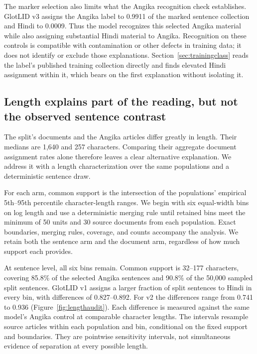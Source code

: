 \documentclass[final]{clv2025}
\begin{document}
The marker selection also limits what the Angika recognition check establishes. GlotLID v3 assigns the Angika label to 0.9911 of the marked sentence collection and Hindi to 0.0009. Thus the model recognizes this selected Angika material while also assigning substantial Hindi material to Angika. Recognition on these controls is compatible with contamination or other defects in training data; it does not identify or exclude those explanations. Section~\ref{sec:trainingclass} reads the label's published training collection directly and finds elevated Hindi assignment within it, which bears on the first explanation without isolating it.

\subsection{Length explains part of the reading, but not the observed sentence contrast}\label{sec:lengthaudit}

The split's documents and the Angika articles differ greatly in length. Their medians are 1,640 and 257 characters. Comparing their aggregate document assignment rates alone therefore leaves a clear alternative explanation. We address it with a length characterization over the same populations and a deterministic sentence draw.

For each arm, common support is the intersection of the populations' empirical 5th--95th percentile character-length ranges. We begin with six equal-width bins on log length and use a deterministic merging rule until retained bins meet the minimum of 50 units and 30 source documents from each population. Exact boundaries, merging rules, coverage, and counts accompany the analysis. We retain both the sentence arm and the document arm, regardless of how much support each provides.

At sentence level, all six bins remain. Common support is 32--177 characters, covering 85.8\% of the selected Angika sentences and 90.8\% of the 50,000 sampled split sentences. GlotLID v1 assigns a larger fraction of split sentences to Hindi in every bin, with differences of 0.827--0.892. For v2 the differences range from 0.741 to 0.936 (Figure~\ref{fig:lengthaudit}). Each difference is measured against the same model's Angika control at comparable character lengths. The intervals resample source articles within each population and bin, conditional on the fixed support and boundaries. They are pointwise sensitivity intervals, not simultaneous evidence of separation at every possible length.
\end{document}
